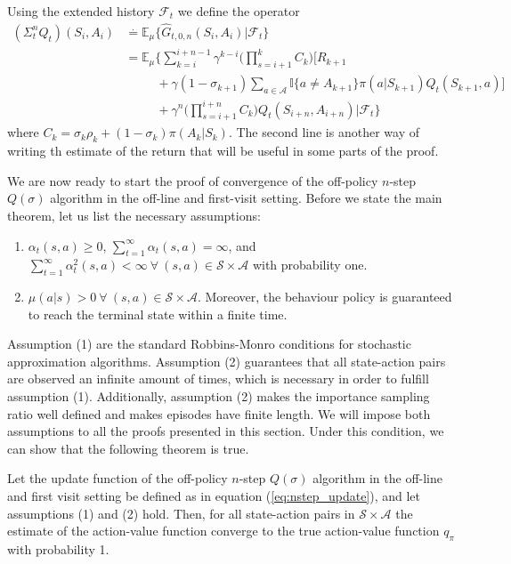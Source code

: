 Using the extended history $\mathcal{F}_t$ we define the operator
%
\begin{align}
\label{eq:qsigma_op}
(\Sigma^n_t Q_t)(S_i, A_i) &\overset{.}{=} \mathbb{E}_\mu \{ \hat{G}_{t, 0,n} 
	(S_i, A_i) | \mathcal{F}_t \} \nonumber \\
%
&= \mathbb{E}_{\mu} \Big\{ \sum_{k=i}^{i+n-1} \gamma^{k-i}  
	\big(\prod_{s=i+1}^{k} C_{k}\big) \big[R_{k+1} \nonumber  \\
& \hspace{30pt} +\gamma (1-\sigma_{k+1}) 
	\sum_{a\in\mathcal{A}}\mathbb{I}\{a \neq A_{k+1}\} 	
	\pi(a|S_{k+1}) Q_t(S_{k+1},a) \big] \nonumber \\
& \hspace{30pt} +\gamma^n \big(\prod_{s=i+1}^{i+n} C_{k}\big) Q_t(S_{i+n}, A_{i+n}) | \mathcal{F}_t \Big\}
\end{align}
%
where $C_{k} = \sigma_{k} \rho_k + (1-\sigma_{k}) \pi(A_k|S_k)$.
The second line is another way of writing th estimate of the return that will be useful in some parts of the proof.

We are now ready to start the proof of convergence of the off-policy $n$-step $Q(\sigma)$ algorithm in the off-line and first-visit setting. 
Before we state the main theorem, let us list the necessary assumptions:
%
\begin{enumerate}
\item $\alpha_t(s,a) \geq 0$, $\sum^\infty_{t=1} \alpha_t(s,a) = \infty$, 
	and $\sum^\infty_{t=1} \alpha^2_t(s,a) < \infty \ \forall \ (s,a) \in \mathcal{S}\times
    \mathcal{A}$  with probability one.
\item $\mu(a|s) > 0 \ \forall \ (s,a) \in \mathcal{S}\times\mathcal{A}$. Moreover, the behaviour policy is guaranteed to reach the terminal state within a finite time.
\end{enumerate}

Assumption (1) are the standard Robbins-Monro conditions for stochastic approximation algorithms.
Assumption (2) guarantees that all state-action pairs are observed an infinite amount of times, which is necessary in order to fulfill assumption (1).
Additionally, assumption (2) makes the importance sampling ratio well defined and makes episodes have finite length. 
We will impose both assumptions to all the proofs presented in this section.
Under this condition, we can show that the following theorem is true.

\begin{theorem}
Let the update function of the off-policy $n$-step $Q(\sigma)$ algorithm in the off-line and first visit setting be defined as in equation (\ref{eq:nstep_update}), and let assumptions (1) and (2) hold. 
Then, for all state-action pairs in $\mathcal{S} \times \mathcal{A}$ the estimate of the action-value function converge to the true action-value function $q_\pi$ with probability 1.
\end{theorem}

